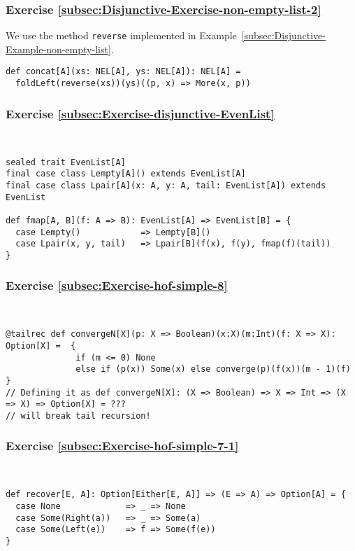 \subsubsection*{Exercise \ref{subsec:Disjunctive-Exercise-non-empty-list-2}}

We use the method \lstinline!reverse! implemented in Example~\ref{subsec:Disjunctive-Example-non-empty-list}.
\begin{lstlisting}
def concat[A](xs: NEL[A], ys: NEL[A]): NEL[A] =
  foldLeft(reverse(xs))(ys)((p, x) => More(x, p))
\end{lstlisting}


\subsubsection*{Exercise \ref{subsec:Exercise-disjunctive-EvenList}}

~
\begin{lstlisting}
sealed trait EvenList[A]
final case class Lempty[A]() extends EvenList[A]
final case class Lpair[A](x: A, y: A, tail: EvenList[A]) extends EvenList

def fmap[A, B](f: A => B): EvenList[A] => EvenList[B] = {
  case Lempty()            => Lempty[B]()
  case Lpair(x, y, tail)   => Lpair[B](f(x), f(y), fmap(f)(tail))
}
\end{lstlisting}



\subsubsection*{Exercise \ref{subsec:Exercise-hof-simple-8}}

~
\begin{lstlisting}
@tailrec def convergeN[X](p: X => Boolean)(x:X)(m:Int)(f: X => X): Option[X] =  {
              if (m <= 0) None
              else if (p(x)) Some(x) else converge(p)(f(x))(m - 1)(f)             }
// Defining it as def convergeN[X]: (X => Boolean) => X => Int => (X => X) => Option[X] = ???
// will break tail recursion!
\end{lstlisting}


\subsubsection*{Exercise \ref{subsec:Exercise-hof-simple-7-1}}

~
\begin{lstlisting}
def recover[E, A]: Option[Either[E, A]] => (E => A) => Option[A] = {
  case None             => _ => None
  case Some(Right(a))   => _ => Some(a)
  case Some(Left(e))    => f => Some(f(e))
}
\end{lstlisting}


